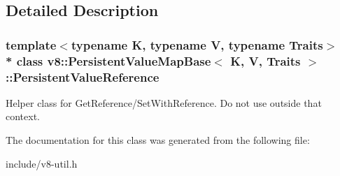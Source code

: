 \subsection{Detailed Description}
\subsubsection*{template$<$typename K, typename V, typename Traits$>$\\*
class v8\+::\+Persistent\+Value\+Map\+Base$<$ K, V, Traits $>$\+::\+Persistent\+Value\+Reference}

Helper class for Get\+Reference/\+Set\+With\+Reference. Do not use outside that context. 

The documentation for this class was generated from the following file\+:\begin{DoxyCompactItemize}
\item 
include/v8-\/util.\+h\end{DoxyCompactItemize}
